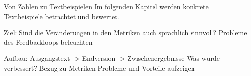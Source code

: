 
Von Zahlen zu Textbeispielen
Im folgenden Kapitel werden konkrete Textbeispiele betrachtet und bewertet.

Ziel:
Sind die Veränderungen in den Metriken auch sprachlich sinnvoll?
Probleme des Feedbackloops beleuchten

Aufbau:
Ausgangstext -> Endversion -> Zwischenergebnisse
Was wurde verbessert?
Bezug zu Metriken
Probleme und Vorteile aufzeigen
